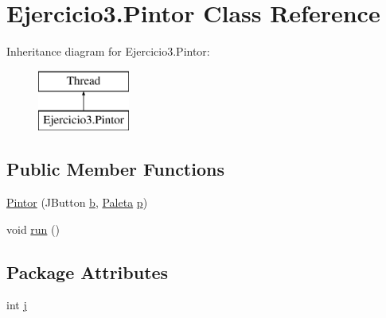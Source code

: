 \hypertarget{class_ejercicio3_1_1_pintor}{}\section{Ejercicio3.\+Pintor Class Reference}
\label{class_ejercicio3_1_1_pintor}
Inheritance diagram for Ejercicio3.\+Pintor\+:\begin{figure}[H]
\begin{center}
\leavevmode
\includegraphics[height=2.000000cm]{class_ejercicio3_1_1_pintor}
\end{center}
\end{figure}
\subsection*{Public Member Functions}
\begin{DoxyCompactItemize}
\item 
\mbox{\hyperlink{class_ejercicio3_1_1_pintor_ad99dbf461a4b20ed3deddfff5513bce0}{Pintor}} (J\+Button \mbox{\hyperlink{class_ejercicio3_1_1_pintor_a8d94252c712662974ff0d5c2e861570f}{b}}, \mbox{\hyperlink{class_ejercicio3_1_1_paleta}{Paleta}} \mbox{\hyperlink{class_ejercicio3_1_1_pintor_a3757fe9547d90e3160d3896865c5ccdc}{p}})
\item 
void \mbox{\hyperlink{class_ejercicio3_1_1_pintor_a591a4e0fea92212b849362801502e61f}{run}} ()
\end{DoxyCompactItemize}
\subsection*{Package Attributes}
\begin{DoxyCompactItemize}
\item 
int \mbox{\hyperlink{class_ejercicio3_1_1_pintor_a2cdf173f4fedc9cd17998fbcc306eac1}{j}}
\end{DoxyCompactItemize}

